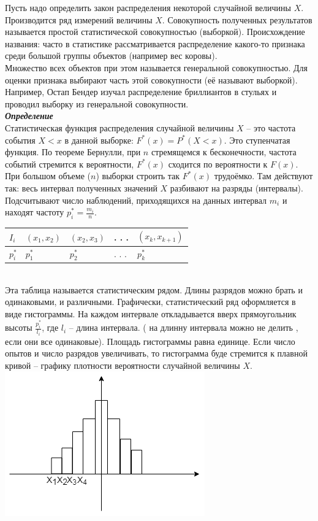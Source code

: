 \documentclass[russian, 12pt, fleqn]{article}
\begin{document}
Пусть надо определить закон распределения некоторой случайной величины $X$. Производится ряд измерений величины $X$. Совокупность полученных результатов называется простой статистической совокупностью (выборкой). Происхождение названия: часто в статистике рассматривается распределение какого-то признака среди большой группы объектов  (например вес коровы).\\ Множество всех объектов при этом
 называется генеральной совокупностью. Для оценки признака выбирают часть этой совокупности (её называют выборкой). Например, Остап Бендер изучал распределение бриллиантов в стульях и проводил выборку из генеральной совокупности.\\
\textit{\textbf{Определение}}\\ 
Статистическая функция распределения случайной величины $X$ -- это частота события $X < x$ в данной выборке: $F^*(x) = P^*(X < x)$.
Это ступенчатая функция. По теореме Бернулли, при $n$ стремящемся к бесконечности, частота событий стремится к вероятности, $F^*(x)$ сходится по вероятности к $F(x)$. При большом объеме ($n$) выборки строить так $F^*(x)$ трудоёмко.  Там действуют так: весь интервал полученных значений $X$ разбивают на разряды (интервалы). Подсчитывают число наблюдений, приходящихся на данных интервал $m_i$  и находят частоту $p_i^* = \frac{m_i}{n}$.\\
\begin{tabular}[b]{ | l | l |  l | l | l |   }
\hline
$ I_i$      & $(x_1, x_2) $ &  $(x_2, x_3) $ & . . . & $(x_k, x_{k + 1})$    \\
\hline
 $p_i^*$ & $p_1^*$       &  $p_2^*$         &  . . . & $p_k^*$\\
\hline
\end{tabular}\\
Эта таблица называется статистическим рядом. Длины разрядов можно брать и одинаковыми, и  различными. 
Графически, статистический ряд оформляется в виде гистограммы. На каждом интервале откладывается вверх прямоугольник высоты $\frac{p_i^*}{l_i}$, где $l_i$ -- длина интервала. ( на длинну интервала можно не делить , если они все одинаковые). Площадь гистограммы равна единице. Если число опытов и число разрядов увеличивать, то гистограмма буде стремится к плавной кривой -- графику плотности  вероятности случайной величины $X$.\\
\includegraphics[scale=0.6]{pg47.png}\\
\end{document}
